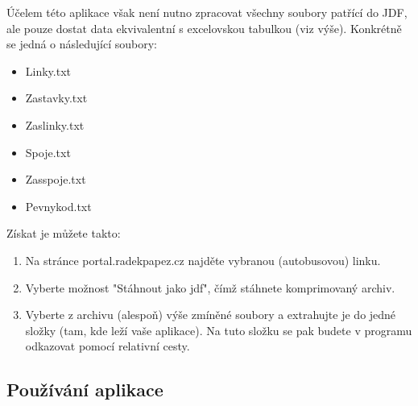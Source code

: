 \documentclass[14pt]{article}
\begin{document}
\begin{enumerate}[label=(\alph*)]
Účelem této aplikace však není nutno zpracovat všechny soubory patřící do JDF, ale pouze dostat data ekvivalentní s excelovskou tabulkou (viz výše). Konkrétně se jedná o následující soubory:
\begin{itemize}
\item Linky.txt
\item Zastavky.txt
\item Zaslinky.txt
\item Spoje.txt
\item Zasspoje.txt
\item Pevnykod.txt
\end{itemize}
Získat je můžete takto:
\begin{enumerate}
\item Na stránce portal.radekpapez.cz najděte vybranou (autobusovou) linku.
\item Vyberte možnost "Stáhnout jako jdf", čímž stáhnete komprimovaný archiv.
\item Vyberte z archivu (alespoň) výše zmíněné soubory a extrahujte je do jedné složky (tam, kde leží vaše aplikace). Na tuto složku se pak budete v programu odkazovat pomocí relativní cesty.
\end{enumerate}

\end{enumerate}

\subsection{Používání aplikace}
\end{document}
